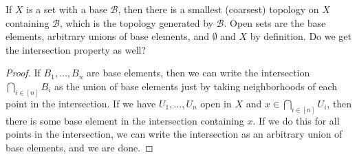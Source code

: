 If $X$ is a set with a base $\mathcal{B}$, then there is a smallest (coarsest) topology on $X$ containing $\mathcal{B}$, which is the topology generated by $\mathcal{B}$.  Open sets are the base elements, arbitrary unions of base elements, and $\emptyset$ and $X$ by definition.  Do we get the intersection property as well?


\begin{proof}
	If $B_1,\dots,B_n$ are base elements, then we can write the intersection $\bigcap\limits_{i\in [n]}B_i$ as the union of base elements just by taking neighborhoods of each point in the intersection.  If we have $U_1,\dots,U_n$ open in $X$ and $x\in \bigcap\limits_{i\in[n]}U_i$, then there is some base element in the intersection containing $x$.  If we do this for all points in the intersection, we can write the intersection as an arbitrary union of base elements, and we are done.
\end{proof}


